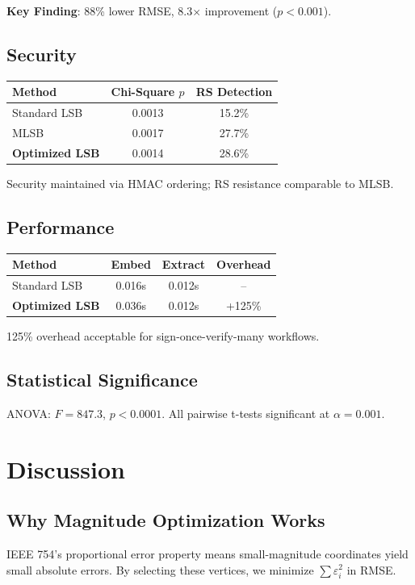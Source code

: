\documentclass[conference]{IEEEtran}
\begin{document}
\textbf{Key Finding}: 88\% lower RMSE, 8.3$\times$ improvement ($p < 0.001$).

\subsection{Security}
\begin{table}[H]
\centering
\begin{tabular}{lcc}
\toprule
\textbf{Method} & \textbf{Chi-Square $p$} & \textbf{RS Detection} \\
\midrule
Standard LSB & 0.0013 & 15.2\% \\
MLSB & 0.0017 & 27.7\% \\
\textbf{Optimized LSB} & 0.0014 & 28.6\% \\
\bottomrule
\end{tabular}
\end{table}

Security maintained via HMAC ordering; RS resistance comparable to MLSB.

\subsection{Performance}
\begin{table}[H]
\centering
\begin{tabular}{lccc}
\toprule
\textbf{Method} & \textbf{Embed} & \textbf{Extract} & \textbf{Overhead} \\
\midrule
Standard LSB & 0.016s & 0.012s & -- \\
\textbf{Optimized LSB} & 0.036s & 0.012s & +125\% \\
\bottomrule
\end{tabular}
\end{table}

125\% overhead acceptable for sign-once-verify-many workflows.

\subsection{Statistical Significance}
ANOVA: $F = 847.3$, $p < 0.0001$. All pairwise t-tests significant at $\alpha = 0.001$.

\section{Discussion}

\subsection{Why Magnitude Optimization Works}
IEEE 754's proportional error property means small-magnitude coordinates yield small absolute errors. By selecting these vertices, we minimize $\sum \varepsilon_i^2$ in RMSE.
\end{document}

